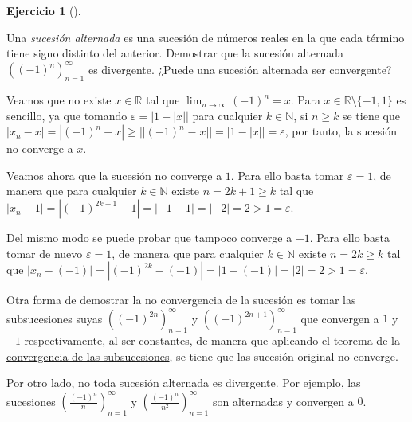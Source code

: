 \documentclass[
  a4paper,
]{scrreport}
\theoremstyle{definition}
\newtheorem{exercise}{Ejercicio}[chapter]
\theoremstyle{remark}
\begin{document}
\leavevmode{}%
\begin{exercise}[]\label{exr-sucesion-alternada}

Una \emph{sucesión alternada} es una sucesión de números reales en la
que cada término tiene signo distinto del anterior. Demostrar que la
sucesión alternada \(((-1)^n)_{n=1}^\infty\) es divergente. ¿Puede una
sucesión alternada ser convergente?

\end{exercise}

\begin{tcolorbox}[enhanced jigsaw, coltitle=black, left=2mm, opacityback=0, colback=white, opacitybacktitle=0.6, breakable, colbacktitle=quarto-callout-tip-color!10!white, leftrule=.75mm, toptitle=1mm, arc=.35mm, bottomtitle=1mm, rightrule=.15mm, titlerule=0mm, title=\textcolor{quarto-callout-tip-color}{\faLightbulb}\hspace{0.5em}{Solución}, colframe=quarto-callout-tip-color-frame, toprule=.15mm, bottomrule=.15mm]
Veamos que no existe \(x\in\mathbb{R}\) tal que
\(\lim_{n\to\infty}(-1)^n=x\). Para \(x\in\mathbb{R}\setminus\{-1,1\}\)
es sencillo, ya que tomando \(\varepsilon=|1-|x||\) para cualquier
\(k\in\mathbb{N}\), si \(n\geq k\) se tiene que
\(|x_n-x| = |(-1)^n-x| \geq ||(-1)^n|-|x|| = |1 - |x|| =\varepsilon\),
por tanto, la sucesión no converge a \(x\).

Veamos ahora que la sucesión no converge a \(1\). Para ello basta tomar
\(\varepsilon=1\), de manera que para cualquier \(k\in\mathbb{N}\)
existe \(n=2k+1\geq k\) tal que
\(|x_n-1|=|(-1)^{2k+1}-1| = |-1-1| = |-2|=2>1=\varepsilon\).

Del mismo modo se puede probar que tampoco converge a \(-1\). Para ello
basta tomar de nuevo \(\varepsilon=1\), de manera que para cualquier
\(k\in\mathbb{N}\) existe \(n=2k\geq k\) tal que
\(|x_n-(-1)|=|(-1)^{2k}-(-1)| = |1-(-1)| = |2|=2>1=\varepsilon\).

Otra forma de demostrar la no convergencia de la sucesión es tomar las
subsucesiones suyas \(\left((-1)^{2n}\right)_{n=1}^\infty\) y
\(\left((-1)^{2n+1}\right)_{n=1}^\infty\) que convergen a \(1\) y \(-1\)
respectivamente, al ser constantes, de manera que aplicando el
\href{https://aprendeconalf.es/analisis-manual/sucesiones.html\#thm-convergencia-subsucesiones}{teorema
de la convergencia de las subsucesiones}, se tiene que las sucesión
original no converge.

Por otro lado, no toda sucesión alternada es divergente. Por ejemplo,
las sucesiones \(\left(\frac{(-1)^n}{n}\right)_{n=1}^\infty\) y
\(\left(\frac{(-1)^n}{n^2}\right)_{n=1}^\infty\) son alternadas y
convergen a \(0\).
\end{tcolorbox}
\end{document}
